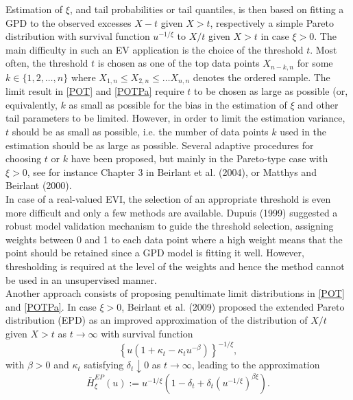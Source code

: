 \documentclass[a4paper,11pt]{article}
\begin{document}
Estimation of $\xi$, and tail probabilities or tail quantiles, is then based on fitting a GPD to the observed excesses $X-t$ given $X>t$, respectively a simple Pareto distribution with survival function $u^{-1/\xi}$ to $X/t$ given $X>t$ in case $\xi >0$.
The main difficulty in such an EV application is the choice of the threshold $t$. Most often, the threshold $t$ is chosen as one of the top data points $X_{n-k,n}$ for some $k \in \{1,2, \ldots,n \}$ where $X_{1,n} \leq X_{2,n} \leq \ldots X_{n,n}$ denotes the ordered sample. The limit result in \eqref{POT} and \eqref{POTPa} require $t$ to be chosen as large as possible (or, equivalently, $k$ as small as possible for the bias in the estimation of $\xi$ and other tail parameters to be limited. However, in order to limit the estimation variance, $t$ should be as small as possible, i.e. the number of data points $k$  used in the estimation should be as large as possible. Several adaptive procedures for choosing $t$ or $k$ have been proposed, but mainly in the Pareto-type case with $\xi >0$, see for instance Chapter 3 in Beirlant et al. (2004), or Matthys and Beirlant (2000). \\
In case of a real-valued EVI, the selection of an appropriate threshold is even more difficult and only a few methods are available. Dupuis (1999) suggested a robust model validation mechanism  to guide the threshold selection, assigning weights between 0 and 1 to each data point where a high weight means that the point should be retained since a GPD model is fitting it well. However, thresholding is required at the level of the weights and hence the method cannot be used in an unsupervised manner. 
\\

Another approach consists of proposing penultimate limit distributions in \eqref{POT} and \eqref{POTPa}. In case $\xi >0$, Beirlant et al. (2009) proposed the extended Pareto distribution (EPD) as an improved approximation of the distribution of $X/t$ given $X>t$ as $t \to \infty$ with survival function
\[
 \left\{u (1+ \kappa_t -\kappa_t u^{-\beta}) \right\}^{-1/\xi} 
,
\]
with $\beta >0$ and $\kappa_t$ satisfying $\delta_t \downarrow 0$ as $t \to \infty$, leading to the approximation
\begin{equation}
\bar{H}_{\xi}^{EP}(u) := u^{-1/\xi}\left( 1- \delta_t + \delta_t (u^{-1/\xi})^{\beta\xi}\right).
\label{EP}
\end{equation}
\end{document}
